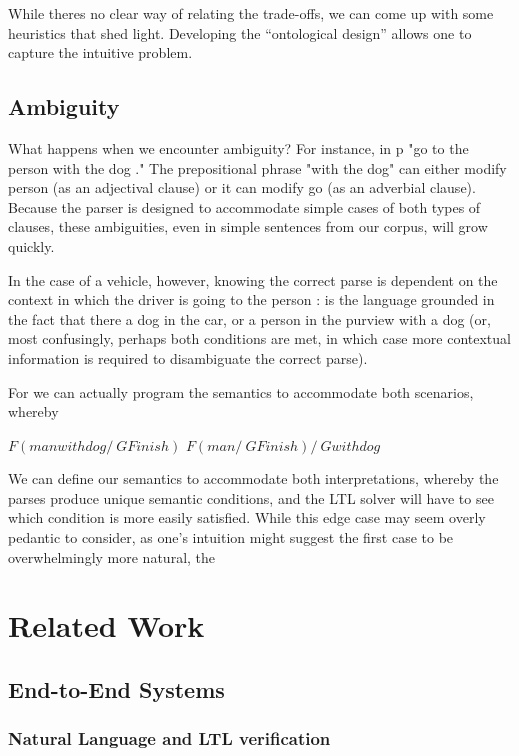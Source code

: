 \documentclass{article}
\begin{document}
While theres no clear way of relating the trade-offs, we can come up with some
heuristics that shed light. Developing the ``ontological design'' allows one to
capture the intuitive problem.


\subsection{Ambiguity}

What happens when we encounter ambiguity? For instance, in p "go to the person
with the dog ." The prepositional phrase "with the dog" can either modify person
(as an adjectival clause) or it can modify go (as an adverbial clause). Because
the parser is designed to accommodate simple cases of both types of clauses,
these ambiguities, even in simple sentences from our corpus, will grow quickly.

In the case of a vehicle, however, knowing the correct parse is dependent on
the context in which the driver is going to the person : is the language
grounded in the fact that there a dog in the car, or a person in the purview
with a dog (or, most confusingly, perhaps both conditions are met, in which case
more contextual information is required to disambiguate the correct parse).

For we can actually program the semantics to accommodate both scenarios, whereby

$F (manwithdog /\ G Finish)$
$F (man /\ G Finish) /\ G withdog$

We can define our semantics to accommodate both interpretations, whereby the
parses produce unique semantic conditions, and the LTL solver will have to see
which condition is more easily satisfied. While this edge case may seem overly
pedantic to consider, as one's intuition might suggest the first case to be
overwhelmingly more natural, the


\section{Related Work}

\subsection{End-to-End Systems}

\subsubsection{Natural Language and LTL verification}
\end{document}
